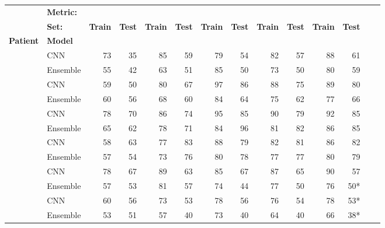 \begin{tabular}{ll rr rr rr rr rr rr}
\toprule
 & \textbf{Metric:} &  &  &  &  &  \\
\cmidrule(lr){3-4}\cmidrule(lr){5-6}\cmidrule(lr){7-8}\cmidrule(lr){9-10}\cmidrule(lr){11-12}
 & \textbf{Set:} & \textbf{Train} & \textbf{Test} & \textbf{Train} & \textbf{Test} & \textbf{Train} & \textbf{Test} & \textbf{Train} & \textbf{Test} & \textbf{Train} & \textbf{Test} \\
\textbf{Patient} & \textbf{Model} &  &  &  &  &  &  &  &  &  &  \\
\midrule
{}  & CNN & 73 & 35 & 85 & 59 & 79 & 54 & 82 & 57 & 88 & 61 \\
  & Ensemble & 55 & 42 & 63 & 51 & 85 & 50 & 73 & 50 & 80 & 59 \\
    & CNN & 59 & 50 & 80 & 67 & 97 & 86 & 88 & 75 & 89 & 80 \\
    & Ensemble & 60 & 56 & 68 & 60 & 84 & 64 & 75 & 62 & 77 & 66 \\
  & CNN & 78 & 70 & 86 & 74 & 95 & 85 & 90 & 79 & 92 & 85 \\
  & Ensemble & 65 & 62 & 78 & 71 & 84 & 96 & 81 & 82 & 86 & 85 \\
    & CNN & 58 & 63 & 77 & 83 & 88 & 79 & 82 & 81 & 86 & 82 \\
    & Ensemble & 57 & 54 & 73 & 76 & 80 & 78 & 77 & 77 & 80 & 79 \\
  & CNN & 78 & 67 & 89 & 63 & 85 & 67 & 87 & 65 & 90 & 57 \\
  & Ensemble & 57 & 53 & 81 & 57 & 74 & 44 & 77 & 50 & 76 & 50* \\
    & CNN & 60 & 56 & 73 & 53 & 78 & 56 & 76 & 54 & 78 & 53* \\
    & Ensemble & 53 & 51 & 57 & 40 & 73 & 40 & 64 & 40 & 66 & 38* \\

\end{tabular}
